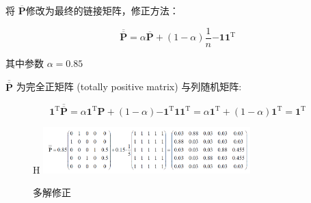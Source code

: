 \documentclass[12pt, a4paper, oneside]{ctexbook}
\begin{document}
\noindent 将 $\overline{\mathbf{P}}$修改为最终的链接矩阵，修正方法：

$$\overline{\overline{\mathbf{P}}}=\alpha\overline{\mathbf{P}}+(1-\alpha)\frac{1}{n}{\mathbf{-}}\mathbf{11}^{\mathrm{T}}$$ 

其中参数 $\alpha=0.85$

$\overline{\overline{\mathbf{P}}}$ 为完全正矩阵 (totally positive matrix) 与列随机矩阵:

$$\mathbf{1} ^{\mathrm{T} }\overline{\overline{\mathbf{P}}} = \alpha\mathbf{1} ^{\mathrm{T} }\mathbf{P} + ( 1- \alpha) \mathbf{- } \mathbf{1} ^{\mathrm{T} }\mathbf{1} \mathbf{1} ^{\mathrm{T} }= \alpha\mathbf{1} ^{\mathrm{T} }+ ( 1- \alpha) \mathbf{1} ^{\mathrm{T} }= \mathbf{1} ^{\mathrm{T} }$$
\begin{figure}{H}
    \centering
    \includegraphics[width = 8cm]{assets/多解修正.png}
    \caption{多解修正}
\end{figure}
\end{document}
